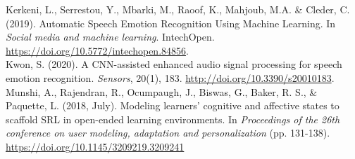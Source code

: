 \documentclass[12pt]{article}
\begin{document}
\noindent Kerkeni, L., Serrestou, Y., Mbarki, M., Raoof, K., Mahjoub, M.A. \& Cleder, C. (2019). \tab \tab Automatic Speech Emotion Recognition Using Machine Learning. In \textit{Social media \tab \tab and machine learning}. IntechOpen. \href{https://doi.org/10.5772/intechopen.84856}{https://doi.org/10.5772/intechopen.84856}.
\\

\noindent Kwon, S. (2020). A CNN-assisted enhanced audio signal processing for speech emotion \tab \tab recognition. \textit{Sensors}, 20(1), 183. \href{http://doi.org/10.3390/s20010183}{http://doi.org/10.3390/s20010183}.
\\

\noindent Munshi, A., Rajendran, R., Ocumpaugh, J., Biswas, G., Baker, R. S., \& Paquette, L. \tab \tab (2018, July). Modeling learners' cognitive and affective states to scaffold SRL in open-\tab \tab ended learning environments. In \textit{Proceedings of the 26th conference on user modeling, \tab \tab adaptation and personalization} (pp. 131-138). \href{https://doi.org/10.1145/3209219.3209241}{https://doi.org/10.1145/3209219.3209241}
\end{document}
